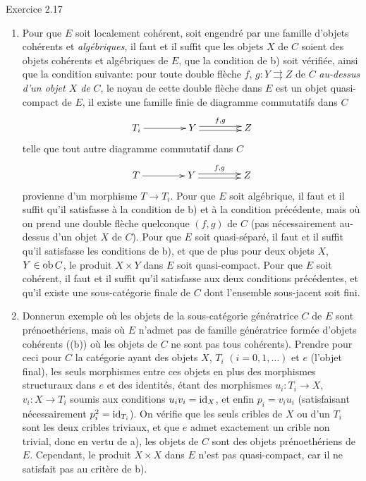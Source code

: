 \documentclass[10pt]{../fichiers-configuration-latex/smfart}
\begin{document}
\begin{enonce*}[remark]{Exercice 2.17}
\begin{enumerate}
\item Pour que $E$ soit localement cohérent, \ie soit engendré par une
  famille d'objets cohérents et \emph{algébriques}, il faut et il
  suffit que les objets $X$ de $C$ soient des objets cohérents et
  algébriques de $E$, \ie que la condition de b) soit vérifiée, ainsi
  que la condition suivante: pour toute double flèche $f$, $g : Y
  \rightrightarrows Z$ de $C$ \emph{au-dessus d'un objet $X$ de} $C$,
  le noyau de cette double flèche dans $E$ est un objet quasi-compact
  de $E$, \ie il existe une famille finie de diagramme commutatifs
  dans $C$
\[
\xymatrix@C=1.5cm{
T_i \ar[r]& Y \ar@<2pt>[r]^{f,g}\ar@<-2pt>[r]&Z
}
\]
telle que tout autre diagramme commutatif dans $C$
\[
\xymatrix@C=1.5cm{
T \ar[r]& Y \ar@<2pt>[r]^{f,g}\ar@<-2pt>[r]&Z
}
\]
provienne d'un morphisme $T \to T_i$. Pour que $E$ soit algébrique,
il faut et il suffit qu'il satisfasse à la condition de b) et à la
condition précédente, mais où on prend une double flèche
quelconque $(f, g)$ de $C$ (pas nécessairement au-dessus d'un objet
$X$ de $C$). Pour que $E$ soit quasi-séparé, il faut et il suffit
qu'il satisfasse les conditions de b), et que de plus pour deux
objets $X$, $Y\in\operatorname{ob} C$, le produit $X\times Y$ dans $E$ soit
quasi-compact. Pour que $E$ soit cohérent, il faut et il suffit
qu'il satisfasse aux deux conditions précédentes, et qu'il existe une
sous-catégorie finale de $C$ dont l'ensemble sous-jacent soit fini.

\item Donner\pageoriginale un exemple où les objets de la
  sous-catégorie génératrice $C$ de $E$ sont prénoethériens, mais où $E$ n'admet pas de famille
  génératrice formée d'objets cohérents (\ie (b)) où les objets de $C$
  ne sont pas tous cohérents). Prendre pour ceci pour $C$ la catégorie
  ayant des objets $X$, $T_i$ $(i = 0, 1, \ldots)$ et $e$ (l'objet
  final), les seuls morphismes entre ces objets en plus des morphismes
  structuraux dans $e$ et des identités, étant des morphismes $u_i :
  T_i \to X$, $v_i : X \to T_i$ soumis aux conditions $u_i v_i =
  \operatorname{id}_X$, et enfin $p_i = v_i u_i$ (satisfaisant nécessairement $p_i^2
  = \operatorname{id}_{T_i}$). On vérifie que les seuls cribles de $X$ ou d'un $T_i$
  sont les deux cribles triviaux, et que $e$ admet exactement un
  crible non trivial, donc en vertu de a), les objets de $C$ sont des
  objets prénoethériens de $E$. Cependant, le produit $X \times X$
  dans $E$ n'est pas quasi-compact, car il ne satisfait pas au critère
  de b).


\end{enumerate}
\end{enonce*}
\end{document}
